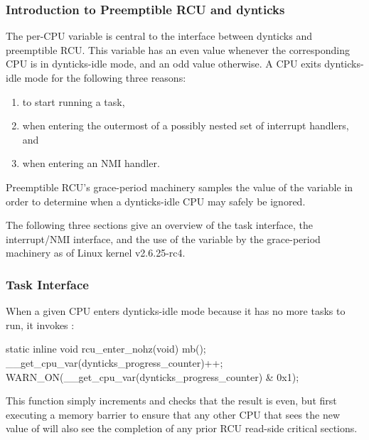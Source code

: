 \subsubsection{Introduction to Preemptible RCU and dynticks}
\label{sec:formal:Introduction to Preemptible RCU and dynticks}

The per-CPU  variable is
central to the interface between dynticks and preemptible RCU.
This variable has an even value whenever the corresponding CPU
is in dynticks-idle mode, and an odd value otherwise.
A CPU exits dynticks-idle mode for the following three reasons:

\begin{enumerate}
\item	to start running a task,
\item	when entering the outermost of a possibly nested set of interrupt
	handlers, and
\item	when entering an NMI handler.
\end{enumerate}

Preemptible RCU's grace-period machinery samples the value of
the  variable in order to
determine when a dynticks-idle CPU may safely be ignored.

The following three sections give an overview of the task
interface, the interrupt/NMI interface, and the use of
the  variable by the
grace-period machinery as of Linux kernel v2.6.25-rc4.

\subsubsection{Task Interface}
\label{sec:formal:Task Interface}

When a given CPU enters dynticks-idle mode because it has no more
tasks to run, it invokes :

\begin{VerbatimN}
static inline void rcu_enter_nohz(void)
{
	mb();
	__get_cpu_var(dynticks_progress_counter)++;
	WARN_ON(__get_cpu_var(dynticks_progress_counter) &
	        0x1);
}
\end{VerbatimN}

This function simply increments  and
checks that the result is even, but first executing a memory barrier
to ensure that any other CPU that sees the new value of
 will also see the completion
of any prior RCU read-side critical sections.

